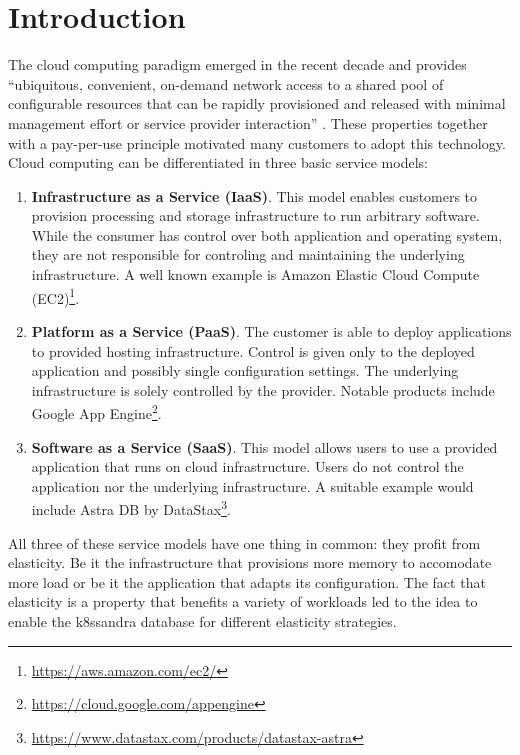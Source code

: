 \chapter{Introduction}
\label{ch:introduction}

The cloud computing paradigm emerged in the recent decade and provides ``ubiquitous, convenient, on-demand network access to a shared pool of configurable resources that can be rapidly provisioned and released with minimal management effort or service provider interaction'' \cite{mellNISTDefinitionCloud2011a}. These properties together with a pay-per-use principle motivated many customers to adopt this technology. Cloud computing can be differentiated in three basic service models:

\begin{enumerate}
    \item \textbf{Infrastructure as a Service (IaaS)}. This model enables customers to provision processing and storage infrastructure to run arbitrary software. While the consumer has control over both application and operating system, they are not responsible for controling and maintaining the underlying infrastructure. A well known example is Amazon Elastic Cloud Compute (EC2)\footnote{\url{https://aws.amazon.com/ec2/}}.

    \item \textbf{Platform as a Service (PaaS)}. The customer is able to deploy applications to provided hosting infrastructure. Control is given only to the deployed application and possibly single configuration settings. The underlying infrastructure is solely controlled by the provider. Notable products include Google App Engine\footnote{\url{https://cloud.google.com/appengine}}.

    \item \textbf{Software as a Service (SaaS)}. This model allows users to use a provided application that runs on cloud infrastructure. Users do not control the application nor the underlying infrastructure. A suitable example would include Astra DB by DataStax\footnote{\url{https://www.datastax.com/products/datastax-astra}}.
\end{enumerate}

All three of these service models have one thing in common: they profit from elasticity. Be it the infrastructure that provisions more memory to accomodate more load or be it the application that adapts its configuration. The fact that elasticity is a property that benefits a variety of workloads led to the idea to enable the k8ssandra database for different elasticity strategies.

